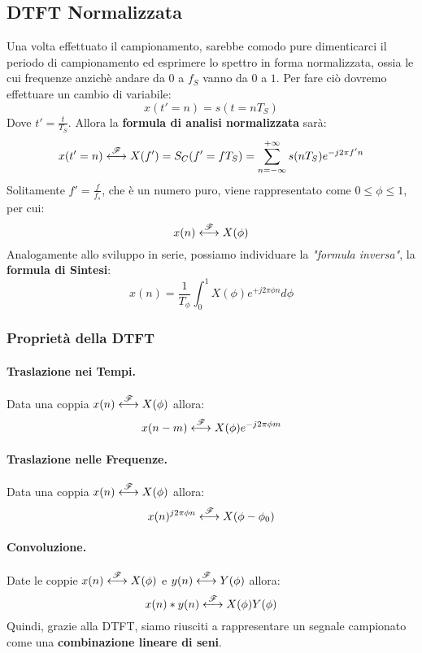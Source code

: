 \subsection{DTFT Normalizzata}
Una volta effettuato il campionamento, sarebbe comodo pure dimenticarci il periodo di campionamento ed esprimere lo spettro in forma normalizzata,
ossia le cui frequenze anzichè andare da $0$ a $f_S$ vanno da $0$ a $1$. Per fare ciò dovremo effettuare un cambio di variabile:
\begin{equation*}
    x(t' = n) = s(t = nT_S)
\end{equation*}
Dove $t' = \frac{t}{T_S}$. Allora la \textbf{formula di analisi normalizzata} sarà:
\begin{align*}
    x(t' = n) \overset{{\mathscr{F}}}{\longleftrightarrow} X(f') = S_C(f' = fT_S) =  \sum_{n = -\infty}^{+\infty} s(nT_S) e^{-j2\pi f'n}
\end{align*}
Solitamente $f' = \frac{f}{f_s}$, che è un numero puro, viene rappresentato come $0 \leq \phi \leq 1$, per cui:
\begin{equation*}
    x(n) \overset{{\mathscr{F}}}{\longleftrightarrow} X(\phi)
\end{equation*}
Analogamente allo sviluppo in serie, possiamo individuare la \textit{"formula inversa"}, la \textbf{formula di Sintesi}:
\begin{equation}
    x(n) = \frac{1}{T_\phi} \int_{0}^{1} X(\phi)e^{+j2\pi \phi n}d\phi
\end{equation}

\subsubsection{Proprietà della DTFT}
\paragraph{Traslazione nei Tempi.}Data una coppia $x(n) \overset{{\mathscr{F}}}{\longleftrightarrow} X(\phi)$ allora:
\begin{equation}
    x(n - m) \overset{{\mathscr{F}}}{\longleftrightarrow} X(\phi)e^{-j2\pi \phi m}
\end{equation}
\paragraph{Traslazione nelle Frequenze.}Data una coppia $x(n) \overset{{\mathscr{F}}}{\longleftrightarrow} X(\phi)$ allora:
\begin{equation}
    x(n)^{j2\pi \phi n} \overset{{\mathscr{F}}}{\longleftrightarrow} X(\phi - \phi_0)
\end{equation}
\paragraph{Convoluzione.}Date le coppie $x(n) \overset{{\mathscr{F}}}{\longleftrightarrow} X(\phi)$ e $y(n) \overset{{\mathscr{F}}}{\longleftrightarrow} Y(\phi)$ allora:
\begin{equation}
    x(n) \ast y(n) \overset{{\mathscr{F}}}{\longleftrightarrow} X(\phi)Y(\phi)
\end{equation}
Quindi, grazie alla DTFT, siamo riusciti a rappresentare un segnale campionato come una \textbf{combinazione lineare di seni}.


